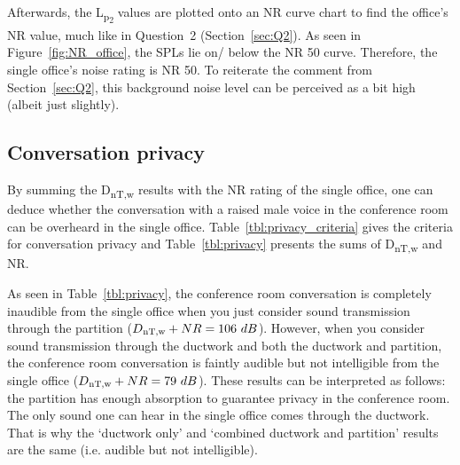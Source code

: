 





Afterwards, the L\textsubscript{p\textsubscript{2}} values are plotted onto an NR curve chart to find the office's NR value, much like in Question~2 (Section~\ref{sec:Q2}).
As seen in Figure~\ref{fig:NR_office}, the SPLs lie on/ below the NR 50 curve.
Therefore, the single office's noise rating is NR 50.
To reiterate the comment from Section~\ref{sec:Q2}, this background noise level can be perceived as a bit high (albeit just slightly).





\newpage
\subsection{Conversation privacy} \label{sec:Q4.4}

By summing the D\textsubscript{nT,w} results with the NR rating of the single office, one can deduce whether the conversation with a raised male voice in the conference room can be overheard in the single office.
Table~\ref{tbl:privacy_criteria} gives the criteria for conversation privacy and Table~\ref{tbl:privacy} presents the sums of D\textsubscript{nT,w} and NR.

As seen in Table~\ref{tbl:privacy}, the conference room conversation is completely inaudible from the single office when you just consider sound transmission through the partition ($D\textsubscript{nT,w} + NR = 106~dB$).
However, when you consider sound transmission through the ductwork and both the ductwork and partition, the conference room conversation is faintly audible but not intelligible from the single office ($D\textsubscript{nT,w} + NR = 79~dB$).
These results can be interpreted as follows:
the partition has enough absorption to guarantee privacy in the conference room. 
The only sound one can hear in the single office comes through the ductwork.
That is why the `ductwork only' and `combined ductwork and partition' results are the same (i.e. audible but not intelligible).



